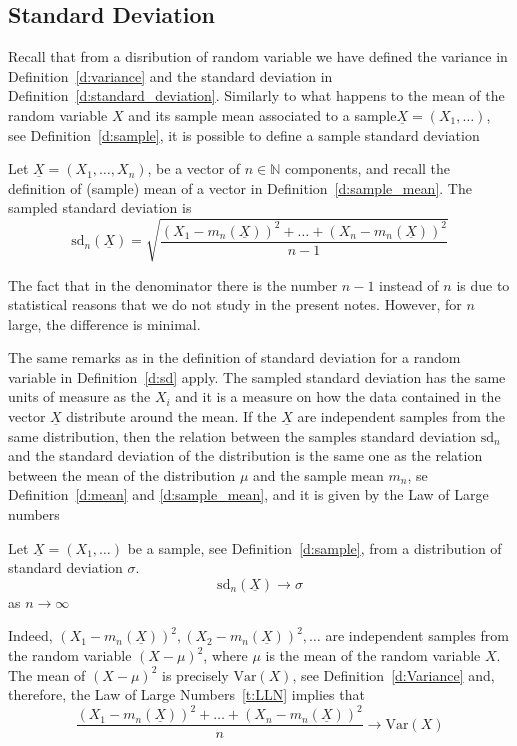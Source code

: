 	\subsection{Standard Deviation }
	Recall that from a disribution of random variable we have defined the variance in Definition~\ref{d:variance} and the standard deviation in Definition~\ref{d:standard_deviation}. Similarly to what happens to the mean of the random variable $X$ and its sample mean associated to a sample$\underline X = (X_1, \ldots )$, see Definition~\ref{d:sample}, it is possible to define a sample standard deviation 
	\begin{definition}
		\label{d:sampled_sd}
		Let $\underline X = (X_1 , \ldots, X_n )$, be a vector of $n \in \mathbb N$ components, and recall the definition of (sample) mean of a vector in Definition~\ref{d:sample_mean}. The sampled standard deviation is 
		\begin{equation}
			\label{e:sampled_sd}
			\text{sd}_n(\underline X ) = \sqrt{\frac{(X_1 - m_n(\underline X ))^2 + \ldots  + (X_n - m_n(\underline X))^2}{n-1}}
		\end{equation}
	\end{definition}
	The fact that in the denominator there is the number $n-1$ instead of $n$ is due to statistical reasons that we do not study in the present notes. However, for $n$ large, the difference is minimal. 

	The same remarks as in the definition of standard deviation for a random variable in Definition~\ref{d:sd} apply. The sampled standard deviation has the same units of measure as the $X_i$ and it is a measure on how the data contained in the vector $\underline X$ distribute around the mean. If the $\underline X$ are independent samples from the same distribution, then the relation between the samples standard deviation $\text{sd}_n$ and the standard deviation of the distribution is the same one as the relation between the mean of the distribution $\mu$ and the sample mean $m_n$, se Definition~\ref{d:mean} and \ref{d:sample_mean}, and it is given by the Law of Large numbers 
      	\begin{proposition}
      		\label{d:standard_deviation}
		Let $\underline X = (X_1, \ldots )$ be a sample, see Definition~\ref{d:sample}, from a distribution of standard deviation $\sigma$.  
      		\begin{equation}
      			\label{e:standard_Deviation}
			\text{sd}_n(\underline X) \to \sigma
      		\end{equation}
		as $n\to \infty$
      	\end{proposition}
	Indeed, $ (X_1  - m_n(\underline X))^2,  (X_2 - m_n(\underline X))^2, \ldots$ are independent samples from the random variable $(X - \mu)^2$, where $\mu$ is the mean of the random variable $X$. The mean of $(X - \mu )^2$ is precisely $\text{Var}(X)$, see Definition~\ref{d:Variance} and, therefore, the Law of Large Numbers~\ref{t:LLN} implies that 
		\begin{equation}
			\frac{(X_1 - m_n(\underline X))^2 + \ldots + (X_n - m_n(\underline X))^2}{n} \to \text{Var}(X)
		\end{equation}
		
